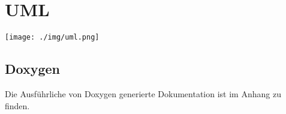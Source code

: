 \chapter{UML}

\begin{minipage}{\linewidth}
\centering%
\texttt{[image: ./img/uml.png]}%
%
\label{fig:uml}%
\end{minipage}
\vspace{10px}

\section{Doxygen}

Die Ausführliche von Doxygen generierte Dokumentation ist im Anhang zu finden.



